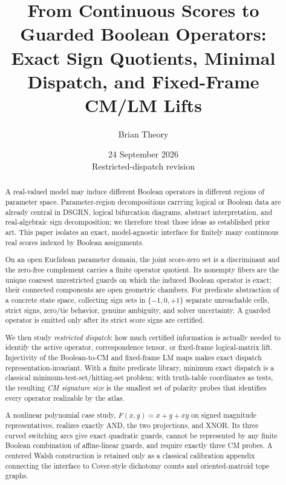 \documentclass[11pt]{article}
\title{\vspace{-1.2cm}\textbf{From Continuous Scores to Guarded Boolean Operators:\\Exact Sign Quotients, Minimal Dispatch, and Fixed-Frame CM/LM Lifts}}
\author{Brian Theory}
\date{24 September 2026\\\small Restricted-dispatch revision}
\theoremstyle{definition}
\theoremstyle{remark}
\begin{document}
\maketitle

\begin{abstract}
A real-valued model may induce different Boolean operators in different regions of parameter space. Parameter-region decompositions carrying logical or Boolean data are already central in DSGRN, logical bifurcation diagrams, abstract interpretation, and real-algebraic sign decomposition; we therefore treat those ideas as established prior art. This paper isolates an exact, model-agnostic interface for finitely many continuous real scores indexed by Boolean assignments.

On an open Euclidean parameter domain, the joint score-zero set is a discriminant and the zero-free complement carries a finite operator quotient. Its nonempty fibers are the unique coarsest unrestricted guards on which the induced Boolean operator is exact; their connected components are open geometric chambers. For predicate abstraction of a concrete state space, collecting sign sets in $\{-1,0,+1\}$ separate unreachable cells, strict signs, zero/tie behavior, genuine ambiguity, and solver uncertainty. A guarded operator is emitted only after its strict score signs are certified.

We then study \emph{restricted dispatch}: how much certified information is actually needed to identify the active operator, correspondence tensor, or fixed-frame logical-matrix lift. Injectivity of the Boolean-to-CM and fixed-frame LM maps makes exact dispatch representation-invariant. With a finite predicate library, minimum exact dispatch is a classical minimum-test-set/hitting-set problem; with truth-table coordinates as tests, the resulting \emph{CM signature size} is the smallest set of polarity probes that identifies every operator realizable by the atlas.

A nonlinear polynomial case study, $F(x,y)=x+y+xy$ on signed magnitude representatives, realizes exactly AND, the two projections, and XNOR. Its three curved switching arcs give exact quadratic guards, cannot be represented by any finite Boolean combination of affine-linear guards, and require exactly three CM probes. A centered Walsh construction is retained only as a classical calibration appendix connecting the interface to Cover-style dichotomy counts and oriented-matroid tope graphs.
\end{abstract}
\end{document}
